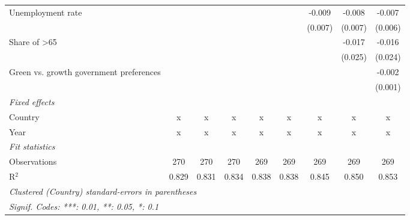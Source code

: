 \begin{table}[htbp]
\begin{tabular}{lcccccccc}
      Unemployment rate                              &         &         &         &         &             & -0.009      & -0.008      & -0.007\\   
                                                     &         &         &         &         &             & (0.007)     & (0.007)     & (0.006)\\   
      Share of >65                                   &         &         &         &         &             &             & -0.017      & -0.016\\   
                                                     &         &         &         &         &             &             & (0.025)     & (0.024)\\   
      Green vs. growth government preferences        &         &         &         &         &             &             &             & -0.002\\   
                                                     &         &         &         &         &             &             &             & (0.001)\\   
      \emph{Fixed effects}\\
      Country                                        & x       & x       & x       & x       & x           & x           & x           & x\\  
      Year                                           & x       & x       & x       & x       & x           & x           & x           & x\\  
      \midrule \emph{Fit statistics}\\
      Observations                                   & 270     & 270     & 270     & 269     & 269         & 269         & 269         & 269\\  
      R$^2$                                          & 0.829   & 0.831   & 0.834   & 0.838   & 0.838       & 0.845       & 0.850       & 0.853\\  
      \midrule
      \multicolumn{9}{l}{\emph{Clustered (Country) standard-errors in parentheses}}\\
      \multicolumn{9}{l}{\emph{Signif. Codes: ***: 0.01, **: 0.05, *: 0.1}}\\
   \end{tabular}
\end{table}


